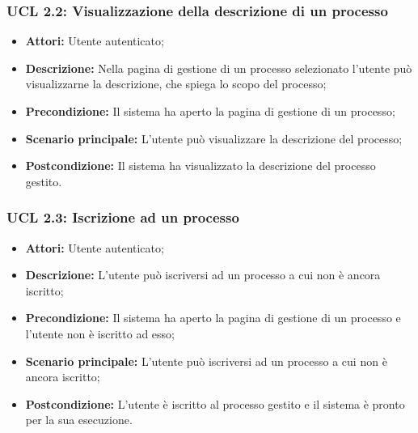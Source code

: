 \hypertarget{L2.2}{}
\subsubsection{UCL 2.2: Visualizzazione della descrizione di un processo}
\begin{itemize}
\item \textbf{Attori:} Utente autenticato;
\item \textbf{Descrizione:} Nella pagina di gestione di un processo selezionato l'utente può visualizzarne la descrizione, che spiega lo scopo del processo;
\item \textbf{Precondizione:} Il sistema ha aperto la pagina di gestione di un processo;\\
\item \textbf{Scenario principale:} L'utente può visualizzare la descrizione del processo;
\item \textbf{Postcondizione:} Il sistema ha visualizzato la descrizione del processo gestito.
\end{itemize}

\hypertarget{L2.3}{}
\subsubsection{UCL 2.3: Iscrizione ad un processo}
\begin{itemize}
\item \textbf{Attori:} Utente autenticato;
\item \textbf{Descrizione:} L'utente può iscriversi ad un processo a cui non è ancora iscritto;
\item \textbf{Precondizione:} Il sistema ha aperto la pagina di gestione di un processo e l'utente non è iscritto ad esso;
\item \textbf{Scenario principale:} L'utente può iscriversi ad un processo a cui non è ancora iscritto;
\item \textbf{Postcondizione:} L'utente è iscritto al processo gestito e il sistema è pronto per la sua esecuzione.
\end{itemize}

